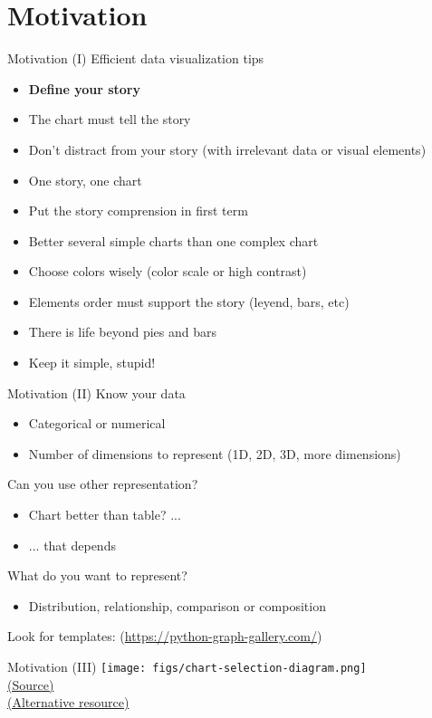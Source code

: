 \documentclass[10pt,compress]{beamer} %
\begin{document}
\section{Motivation}

\begin{frame}{Motivation (I)}
	Efficient data visualization tips
	\begin{itemize}
		\item \textbf{Define your story}
		\item The chart must tell the story
		\item Don't distract from your story (with irrelevant data or visual elements)
		\item One story, one chart
		\item Put the story comprension in first term
		\item Better several simple charts than one complex chart
		\item Choose colors wisely (color scale or high contrast)
		\item Elements order must support the story (leyend, bars, etc)
		\item There is life beyond pies and bars
		\item Keep it simple, stupid!
	\end{itemize}
\end{frame}

\begin{frame}{Motivation (II)}
	Know your data
	\begin{itemize}
		\item Categorical or numerical
		\item Number of dimensions to represent (1D, 2D, 3D, more dimensions)
	\end{itemize}
	Can you use other representation?
	\begin{itemize}
		\item Chart better than table? ...
		\item ... that depends
	\end{itemize}
	What do you want to represent?
	\begin{itemize}
		\item Distribution, relationship, comparison or composition
	\end{itemize}
	Look for templates: (\url{https://python-graph-gallery.com/})
\end{frame}

\begin{frame}[plain]{Motivation (III)}
	\centering \texttt{[image: figs/chart-selection-diagram.png]}\\
	\centering \tiny \href{https://flex.bi/create-beautiful-dashboard-works/}{(Source)}\\
	\href{http://experception.net/Franconeri_ExperCeptionDotNet_ChartChooser.pdf}{(Alternative resource)}
\end{frame}
\end{document}
